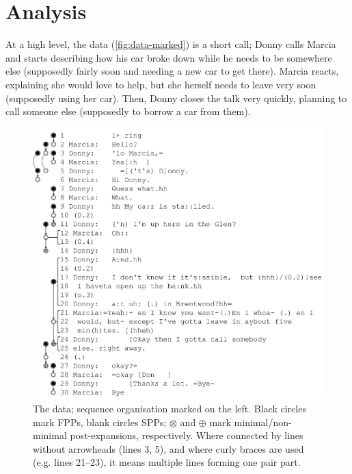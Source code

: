 \documentclass[11pt]{article}
\begin{document}
\section*{Analysis}{
	At a high level, the data (\autoref{fig:data-marked}) is a short call; Donny calls Marcia and starts describing how his car broke down while he needs to be somewhere else (supposedly fairly soon and needing a new car to get there). Marcia reacts, explaining she would love to help, but she herself needs to leave very soon (supposedly using her car). Then, Donny closes the talk very quickly, planning to call someone else (supposedly to borrow a car from them).

	\begin{figure}[h!tb]
		\centering
		\includegraphics[width=\columnwidth]{../data-marked.pdf}
		\caption{The data; sequence organisation marked on the left. Black circles mark FPPs, blank circles SPPs; $\boldsymbol{\mathbf{\otimes}}$ and $\boldsymbol{\mathbf{\oplus}}$ mark minimal/non-minimal post-expansions, respectively. Where connected by lines without arrowheads (lines 3, 5), and where curly braces are used (e.g. lines 21--23), it means multiple lines forming one pair part.}
		\label{fig:data-marked}
	\end{figure}

}
\end{document}
